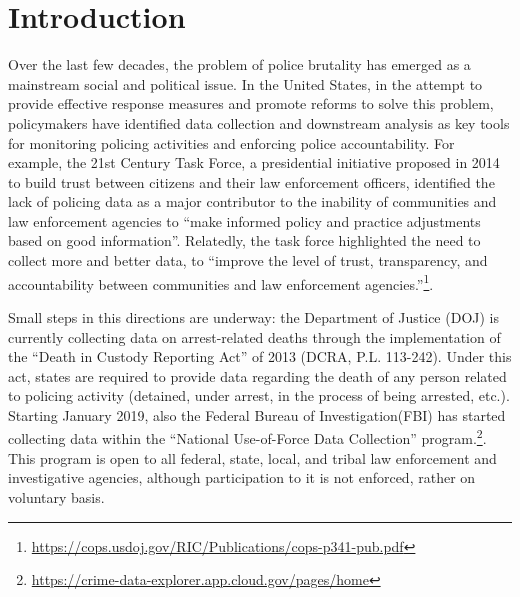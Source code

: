

\section{Introduction}



Over the last few decades, the problem of police brutality has emerged as a mainstream social and political issue. In the United States, in the attempt to provide effective response measures and promote reforms to solve this problem, policymakers have identified data collection and downstream analysis as key tools for monitoring policing activities and enforcing police accountability. For example, the 21st Century Task Force, a presidential initiative proposed in 2014 to build trust between citizens and their law enforcement officers, identified the lack of policing data as a major contributor to the inability of communities and law enforcement agencies to ``make informed policy and practice adjustments based on good information''. Relatedly, the task force highlighted the need to collect more and better data, to ``improve the level of trust, transparency, and accountability between communities and law enforcement agencies.''\footnote{\url{https://cops.usdoj.gov/RIC/Publications/cops-p341-pub.pdf}}. 

Small steps in this directions are underway: the Department of Justice (DOJ) is currently collecting data on arrest-related deaths through the implementation of the ``Death in Custody Reporting Act'' of 2013 (DCRA, P.L. 113-242). Under this act, states are required to provide data regarding the death of any person related to policing activity (detained, under arrest, in the process of being arrested, etc.). Starting January 2019, also the Federal Bureau of Investigation(FBI) has started collecting data within the ``National Use-of-Force Data Collection'' program.\footnote{\url{https://crime-data-explorer.app.cloud.gov/pages/home}}. This program is open to all federal, state, local, and tribal law enforcement and investigative agencies, although participation to it is not enforced, rather on voluntary basis. 

